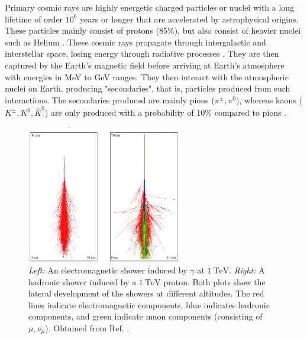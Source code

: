\documentclass[a4paper]{report}
\numberwithin{equation}{section}
\begin{document}
Primary cosmic rays are highly energetic charged particles or nuclei with a long lifetime of order $10^6$ years or longer that are accelerated by 
astrophysical origins. These particles mainly consist of protons (85\%), but also consist of heavier nuclei such as Helium \cite{Tanabashi2018}. 
These cosmic rays propagate through intergalactic and interstellar space, losing energy through radiative processes \cite{DeDomenico2012}.
They are then captured by the Earth's magnetic field before arriving at Earth's atmosphere with energies in MeV to GeV ranges. 
They then interact with the atmospheric nuclei on Earth, producing "secondaries", that is, particles produced from such interactions. The secondaries
produced are mainly pions ($\pi^\pm, \pi^0$), whereas kaons ($K^\pm, K^0, \bar{K}^0$) are only produced with a probability of 10\% compared to pions \cite{Grupen2005}. \par 

\begin{figure}[!h]
	\centering
	\includegraphics[width=0.6\textwidth]{em_hadronic_showers.png}
	\caption{ \textit{Left:} An electromagnetic shower induced by $\gamma$ at $\SI{1}{\tera\electronvolt}$. 
				\textit{Right: } A hadronic shower induced by a $\SI{1}{\tera\electronvolt}$ proton. Both plots show the lateral
				development of the showers at different altitudes. The red lines indicate electromagnetic components, blue indicates 
				hadronic components, and green indicate muon components (consisting of $\mu, \nu_\mu$). Obtained from Ref. \cite{Haeffner2014}. }
	\label{fig:em_had_showers}
\end{figure}
\end{document}
